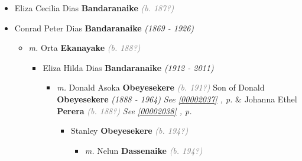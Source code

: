 \documentclass[10pt, openany]{book}
\begin{document}
\begin{itemize}
{\begin{itemize}
{\begin{itemize}
{\begin{itemize}
{\begin{itemize}
\end{itemize}
   }
\item{Conrad Rama Chandra Dias \textbf{Bandaranaike} \textcolor{slorange}{\textit{(b. 1902)}}
    }
\item{Padmawathie Dias \textbf{Bandaranaike} \textcolor{gray}{\textit{(b. 190?)}}
  }
\item{Luna Chandrawathie Dias \textbf{Bandaranaike} \textcolor{gray}{\textit{(b. 191?)}}
   }
\item{Indrani Dias \textbf{Bandaranaike} \textcolor{gray}{\textit{(b. 191?)}}
  }
\end{itemize}}
\end{itemize}
   }
\item{Eliza Cecilia Dias \textbf{Bandaranaike} \textcolor{gray}{\textit{(b. 187?)}}
   }
\item{Conrad Peter Dias \textbf{Bandaranaike} \textcolor{slorange}{\textit{(1869 - 1926)}}
\begin{itemize}
\item{\textit{m.} Orta \textbf{Ekanayake} \textcolor{gray}{\textit{(b. 188?)}}   \label{couple:00001814:00001815} \begin{itemize}
\item{Eliza Hilda Dias \textbf{Bandaranaike} \textcolor{slorange}{\textit{(1912 - 2011)}}
\begin{itemize}
\item{\textit{m.} Donald Asoka \textbf{Obeyesekere} \textcolor{gray}{\textit{(b. 191?)}} Son of  Donald \textbf{Obeyesekere} \textcolor{slorange}{\textit{(1888 - 1964)}} \textcolor{slteal}{\textit{See  \autoref{00002037} \textit{, p. \pageref{00002037} }}}  \&  Johanna Ethel \textbf{Perera} \textcolor{gray}{\textit{(b. 188?)}} \textcolor{slteal}{\textit{See  \autoref{00002038} \textit{, p. \pageref{00002038} }}}   \label{couple:00001822:00001823} \begin{itemize}
\item{Stanley \textbf{Obeyesekere} \textcolor{gray}{\textit{(b. 194?)}}
\begin{itemize}
\item{\textit{m.} Nelun \textbf{Dassenaike} \textcolor{gray}{\textit{(b. 194?)}}   \label{couple:00001824:00001825} \begin{itemize}

\end{itemize}}
\end{itemize}}
\end{itemize}}
\end{itemize}}
\end{itemize}}
\end{itemize}}
\end{itemize}}
\end{itemize}
\end{document}
